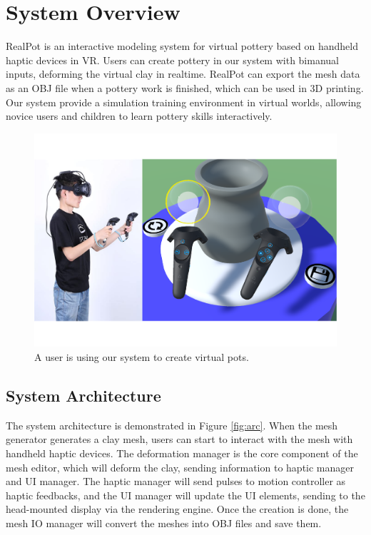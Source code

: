 \documentclass{svjour3}                     %
\begin{document}
\section{System Overview}
\label{sec:3}
RealPot is an interactive modeling system for virtual pottery based on handheld haptic devices in VR.
Users can create pottery in our system with bimanual inputs, deforming the virtual clay in realtime.
RealPot can export the mesh data as an OBJ file when a pottery work is finished, which can be used in 3D printing.
Our system provide a simulation training environment in virtual worlds, allowing novice users and children to learn pottery skills interactively.

\begin{figure}
\includegraphics[width=\textwidth]{fig1}
\caption{A user is using our system to create virtual pots.}
\label{fig:results}
\end{figure}

\subsection{System Architecture}
\label{sec:3.1}

The system architecture is demonstrated in Figure \ref{fig:arc}. When the mesh generator generates a clay mesh, users can start to interact with the mesh with handheld haptic devices. The deformation manager is the core component of the mesh editor, which will deform the clay, sending information to haptic manager and UI manager. The haptic manager will send pulses to motion controller as haptic feedbacks, and the UI manager will update the UI elements, sending to the head-mounted display via the rendering engine. Once the creation is done, the mesh IO manager will convert the meshes into OBJ files and save them.
\end{document}
